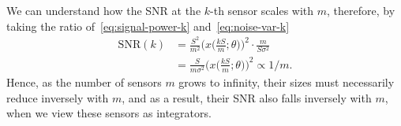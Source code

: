 \documentclass[conference]{IEEEtran}
\begin{document}
We can understand how the SNR at the $k$-th sensor scales with $m$, therefore,
by taking the ratio of~\eqref{eq:signal-power-k} and~\eqref{eq:noise-var-k}
\begin{align}
	\text{SNR}(k) &= \frac{S^2}{m^2} \bigg(x\Big(\frac{kS}{m}; \theta\Big)\bigg)^2 \cdot \frac{m}{S\sigma^2} \\
	&= \frac{S}{m\sigma^2} \bigg(x\Big(\frac{kS}{m}; \theta\Big)\bigg)^2 \propto 1/m.
\end{align}
Hence, as the number of sensors $m$ grows to infinity, their sizes must
necessarily reduce inversely with $m$, and as a result, their SNR also falls
inversely with $m$, when we view these sensors as integrators.
\end{document}
